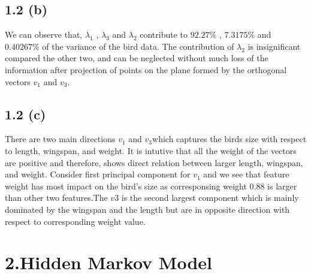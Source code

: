 \documentclass[10pt,letterpaper]{article}
\begin{document}
\subsection{1.2 (b)} 
We can observe that, $\lambda_1$ , $\lambda_3$  and $\lambda_2$ contribute to $92.27\%$  , $7.3175\%$ and $0.40267\%$ of the variance of the bird data. The contribution of $\lambda_2$ is insignificant compared the other two, and can be neglected without much loss of the information after projection of points on the plane formed by the orthogonal vectors $v_1$ and $v_3$.
\subsection{1.2 (c)}  
There are two main directions $v_1$ and $v_3$which captures the birds size with respect to length, wingspan, and weight.  It is intutive that all the weight of the vectors are positive and therefore, shows direct relation between larger length,
wingspan, and weight. Consider first principal component for $v_1$ and we see that feature weight has most impact on the bird's size as corresponsing weight 0.88 is larger than other two features.The $v3$ is the second largest component which is mainly dominated by the wingspan and the length but are in opposite direction with respect to corresponding weight value. 

\section{2.Hidden Markov Model}
\end{document}
